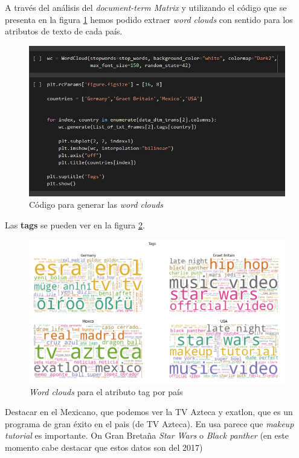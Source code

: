 \documentclass[a4paper,12pt]{article}
\begin{document}
A trav\'es del an\'alisis del {\itshape document-term Matrix} y utilizando el c\'odigo que se presenta en la figura \ref{fig:colud_1}  hemos podido extraer {\itshape word clouds} con sentido para los atributos de texto de cada pa\'is.


\begin{figure}[h!]
\centering
\includegraphics[width=13cm]{cod_word.JPG}
\caption{C\'odigo para generar las {\itshape word clouds}}
\label{fig:colud_1}
\end{figure}

Las \textbf{tags} se pueden ver en la figura \ref{fig:colud_2}.


\begin{figure}[h!]
\centering
\includegraphics[width=13cm]{wordcloud_tags.png}

\caption{{\itshape Word clouds} para el atributo tag por pa\'is}
\label{fig:colud_2}
\end{figure}

Destacar en el Mexicano, que podemos ver la TV Azteca y exatlon, que es un programa de gran \'exito en el pais (de TV Azteca). En usa parece que {\itshape makeup tutorial} es importante. On Gran Breta\~na {\itshape Star Wars} o {\itshape Black panther} (en este momento cabe destacar que estos datos son del 2017)
\end{document}
